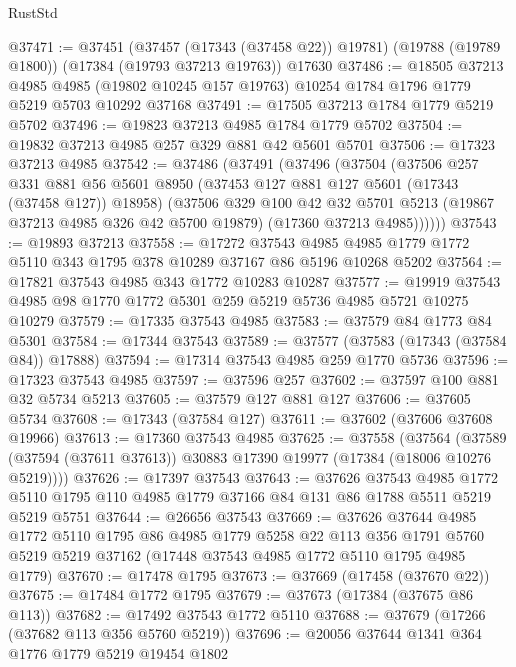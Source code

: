 \begin{lexlean}{RustStd}
\begin{coremodule}
@37471 := @37451
    (@37457 (@17343 (@37458 @22)) @19781)
    (@19788 (@19789 @1800))
    (@17384 (@19793 @37213 @19763))
    @17630
@37486 := @18505
    @37213
    @4985
    @4985
    (@19802 @10245 @157 @19763)
    @10254
    @1784
    @1796
    @1779
    @5219
    @5703
    @10292
    @37168
@37491 := @17505 @37213 @1784 @1779 @5219 @5702
@37496 := @19823 @37213 @4985 @1784 @1779 @5702
@37504 := @19832 @37213 @4985 @257 @329 @881 @42 @5601 @5701
@37506 := @17323 @37213 @4985
@37542 := @37486
    (@37491
      (@37496
        (@37504
          (@37506
            @257
            @331
            @881
            @56
            @5601
            @8950
            (@37453 @127 @881 @127 @5601 (@17343 (@37458 @127)) @18958)
            (@37506
              @329
              @100
              @42
              @32
              @5701
              @5213
              (@19867 @37213 @4985 @326 @42 @5700 @19879)
              (@17360 @37213 @4985))))))
@37543 := @19893 @37213
@37558 := @17272
    @37543
    @4985
    @4985
    @1779
    @1772
    @5110
    @343
    @1795
    @378
    @10289
    @37167
    @86
    @5196
    @10268
    @5202
@37564 := @17821 @37543 @4985 @343 @1772 @10283 @10287
@37577 := @19919 @37543 @4985 @98 @1770 @1772 @5301 @259 @5219 @5736 @4985 @5721 @10275 @10279
@37579 := @17335 @37543 @4985
@37583 := @37579 @84 @1773 @84 @5301
@37584 := @17344 @37543
@37589 := @37577 (@37583 (@17343 (@37584 @84)) @17888)
@37594 := @17314 @37543 @4985 @259 @1770 @5736
@37596 := @17323 @37543 @4985
@37597 := @37596 @257
@37602 := @37597 @100 @881 @32 @5734 @5213
@37605 := @37579 @127 @881 @127
@37606 := @37605 @5734
@37608 := @17343 (@37584 @127)
@37611 := @37602 (@37606 @37608 @19966)
@37613 := @17360 @37543 @4985
@37625 := @37558
    (@37564 (@37589 (@37594 (@37611 @37613)) @30883 @17390 @19977 (@17384 (@18006 @10276 @5219))))
@37626 := @17397 @37543
@37643 := @37626
    @37543
    @4985
    @1772
    @5110
    @1795
    @110
    @4985
    @1779
    @37166
    @84
    @131
    @86
    @1788
    @5511
    @5219
    @5219
    @5751
@37644 := @26656 @37543
@37669 := @37626
    @37644
    @4985
    @1772
    @5110
    @1795
    @86
    @4985
    @1779
    @5258
    @22
    @113
    @356
    @1791
    @5760
    @5219
    @5219
    @37162
    (@17448 @37543 @4985 @1772 @5110 @1795 @4985 @1779)
@37670 := @17478 @1795
@37673 := @37669 (@17458 (@37670 @22))
@37675 := @17484 @1772 @1795
@37679 := @37673 (@17384 (@37675 @86 @113))
@37682 := @17492 @37543 @1772 @5110
@37688 := @37679 (@17266 (@37682 @113 @356 @5760 @5219))
@37696 := @20056 @37644 @1341 @364 @1776 @1779 @5219 @19454 @1802

\end{coremodule}
\end{lexlean}
